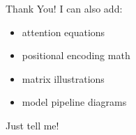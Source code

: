 \documentclass[
  11pt,
  ignorenonframetext,
]{beamer}
\providecommand{\tightlist}{%
  \setlength{\itemsep}{0pt}\setlength{\parskip}{0pt}}
\begin{document}
\begin{frame}{Thank You!}
\label{thank-you}
I can also add:

\begin{itemize}
\tightlist
\item
  attention equations\\
\item
  positional encoding math\\
\item
  matrix illustrations\\
\item
  model pipeline diagrams
\end{itemize}

Just tell me!
\end{frame}
\end{document}
